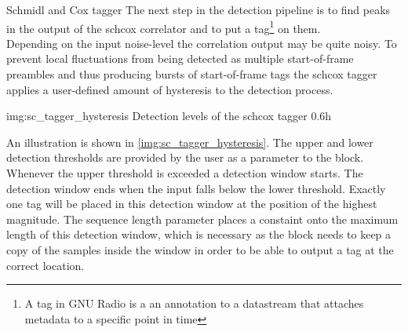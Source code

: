 \begin{subchapter}{Schmidl and Cox tagger}
  The next step in the detection pipeline is to find peaks in
  the output of the \acrlong{schcox} correlator and to put
  a tag\footnote{A tag in GNU Radio is a an annotation to a
  datastream that attaches metadata to a specific point in time}
  on them. \\

  Depending on the input noise-level the correlation output
  may be quite noisy. To prevent local fluctuations from being
  detected as multiple start-of-frame preambles and thus producing
  bursts of start-of-frame tags the \acrshort{schcox} tagger
  applies a user-defined amount of hysteresis to the detection
  process.

               {img:sc_tagger_hysteresis}
               {Detection levels of the \acrshort{schcox} tagger}
               {0.6}{h}

  An illustration is shown in \autoref{img:sc_tagger_hysteresis}.
  The upper and lower detection thresholds are provided by
  the user as a parameter to the block. \\

  Whenever the upper threshold is exceeded a detection window starts.
  The detection window ends when the input falls below the lower
  threshold.
  Exactly one tag will be placed in this detection window at
  the position of the highest magnitude.
  The sequence length parameter places a constaint onto the
  maximum length of this detection window, which is necessary
  as the block needs to keep a copy of the samples inside the
  window in order to be able to output a tag at the correct location.
\end{subchapter}

